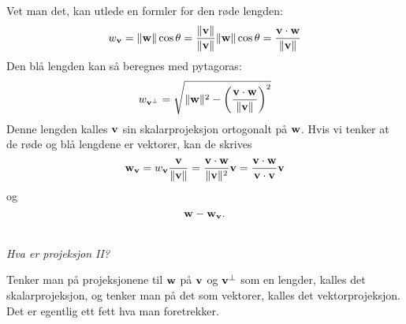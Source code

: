 Vet man det, kan utlede en formler for den røde lengden:
\[
w_{\mathbf{v}}=\|\mathbf{w}\| \cos \theta=\frac{\|\mathbf{v}\|}{\|\mathbf{v}\|} \|\mathbf{w}\| \cos \theta =\frac{\mathbf{v} \cdot \mathbf{w}}{\|\mathbf{v}\|}
\]
Den blå lengden kan så beregnes med pytagoras:
\[
w_{\mathbf{v}^{\perp}}=\sqrt{\|\mathbf{w}\|^2-\left(\frac{\mathbf{v} \cdot \mathbf{w}}{\|\mathbf{v}\|}\right)^2}
\]
Denne lengden kalles $\mathbf{v}$ sin skalarprojeksjon ortogonalt på $\mathbf{w}$. Hvis vi tenker at de røde og blå lengdene er vektorer, kan de skrives
\[
\mathbf{w}_{\mathbf{v}}=w_{\mathbf{v}}\frac{\mathbf{v}}{\|\mathbf{v}\|}=\frac{\mathbf{v} \cdot \mathbf{w}}{\|\mathbf{v}\|^2}\mathbf{v}=\frac{\mathbf{v} \cdot \mathbf{w}}{\mathbf{v} \cdot \mathbf{v}}\mathbf{v}
\]
og
\[
\mathbf{w} - \mathbf{w}_{\mathbf{v}}.
\]
 \begin{center}
\\
{\small \textit{Hva er projeksjon II?}}
\end{center}
Tenker man på projeksjonene til $\mathbf{w}$ på $\mathbf{v}$ og $\mathbf{v}^{\perp}$ som en lengder, kalles det skalarprojeksjon, og tenker man på det som vektorer, kalles det vektorprojeksjon. Det er egentlig ett fett hva man foretrekker.

